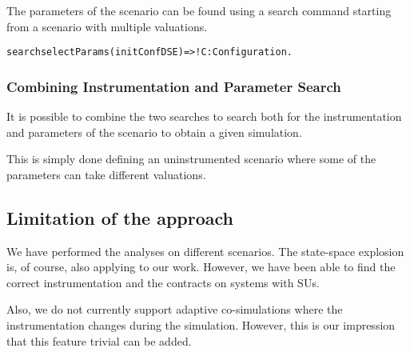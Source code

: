 The parameters of the scenario can be found using a search command starting from a scenario with multiple valuations.
\begin{alltt}
  \small
  search selectParams(initConfDSE)  =>! C:Configuration .
\end{alltt}

\subsubsection{Combining Instrumentation and Parameter Search}
It is possible to combine the two searches to search both for the instrumentation and parameters of the scenario to obtain a given simulation.

This is simply done defining an uninstrumented scenario where some of the parameters can take different valuations.


\subsection{Limitation of the approach}
We have performed the analyses on different scenarios. 
The state-space explosion is, of course, also applying to our work. 
However, we have been able to find the correct instrumentation and the contracts on systems with  SUs.

Also, we do not currently support adaptive co-simulations  where the instrumentation changes during the simulation. 
However, this is our impression that this feature trivial can be added.